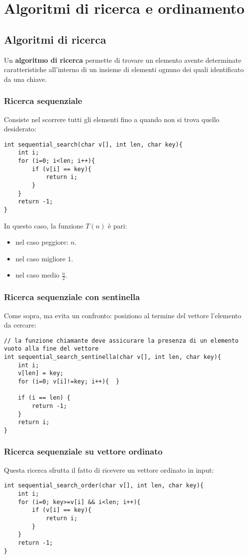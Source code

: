 \chapter{Algoritmi di ricerca e ordinamento}

\section{Algoritmi di ricerca}
Un \textbf{algoritmo di ricerca} permette di trovare un elemento avente determinate caratteristiche all'interno di un insieme di elementi ognuno dei quali identificato da una chiave.

\subsection{Ricerca sequenziale}
Consiste nel scorrere tutti gli elementi fino a quando non si trova quello desiderato:
\begin{lstlisting}[title={Ricerca sequenziale}]
int sequential_search(char v[], int len, char key){
    int i;
    for (i=0; i<len; i++){
        if (v[i] == key){
            return i;
        }
    }
    return -1;
}
\end{lstlisting}
In questo caso, la funzione $T(n)$ è pari:
\begin{itemize}[noitemsep, nolistsep]
	\item nel caso peggiore: $n$.
	\item nel caso migliore $1$.
	\item nel caso medio $\frac{n}{2}$.
\end{itemize}

\subsection{Ricerca sequenziale con sentinella}
Come sopra, ma evita un confronto: posiziono al termine del vettore l'elemento da cercare:
\begin{lstlisting}[title={Ricerca sequenziale con sentinella}]
// la funzione chiamante deve assicurare la presenza di un elemento vuoto alla fine del vettore
int sequential_search_sentinella(char v[], int len, char key){
    int i;
    v[len] = key;
    for (i=0; v[i]!=key; i++){	}

    if (i == len) {
        return -1;
    }
    return i;
}
\end{lstlisting}

\subsection{Ricerca sequenziale su vettore ordinato}
Questa ricerca sfrutta il fatto di ricevere un vettore ordinato in input:
\begin{lstlisting}[title={Ricerca sequenziale su vettore ordinato}]
int sequential_search_order(char v[], int len, char key){
    int i;
    for (i=0; key>=v[i] && i<len; i++){
        if (v[i] == key){
            return i;
        }
    }
    return -1;
}
\end{lstlisting}

